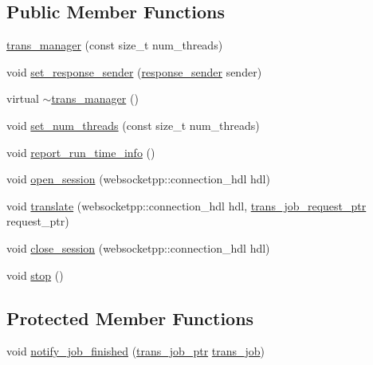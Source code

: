 \subsection*{Public Member Functions}
\begin{DoxyCompactItemize}
\item 
\hyperlink{classuva_1_1smt_1_1bpbd_1_1server_1_1trans__manager_a053a8f5be8b004358e5e20b3a1810efb}{trans\+\_\+manager} (const size\+\_\+t num\+\_\+threads)
\item 
void \hyperlink{classuva_1_1smt_1_1bpbd_1_1server_1_1trans__manager_a03bbff4118af58730ae43c9088203e00}{set\+\_\+response\+\_\+sender} (\hyperlink{classuva_1_1smt_1_1bpbd_1_1server_1_1trans__manager_ac7a3a0d2d4e7d21b2ce55161bf84f53e}{response\+\_\+sender} sender)
\item 
virtual \hyperlink{classuva_1_1smt_1_1bpbd_1_1server_1_1trans__manager_aa63b92c7bc0fdc41b879d02f16563506}{$\sim$trans\+\_\+manager} ()
\item 
void \hyperlink{classuva_1_1smt_1_1bpbd_1_1server_1_1trans__manager_a27073dba1257cacb734cc1063f2ee647}{set\+\_\+num\+\_\+threads} (const size\+\_\+t num\+\_\+threads)
\item 
void \hyperlink{classuva_1_1smt_1_1bpbd_1_1server_1_1trans__manager_ab943355ee7859a85c9d0e0cc6fd57206}{report\+\_\+run\+\_\+time\+\_\+info} ()
\item 
void \hyperlink{classuva_1_1smt_1_1bpbd_1_1server_1_1trans__manager_ac1d444c0788fe1ebbd2e771bff2dd5b9}{open\+\_\+session} (websocketpp\+::connection\+\_\+hdl hdl)
\item 
void \hyperlink{classuva_1_1smt_1_1bpbd_1_1server_1_1trans__manager_adfc5b34f1b6e6211f3c87626ccc2cfa0}{translate} (websocketpp\+::connection\+\_\+hdl hdl, \hyperlink{namespaceuva_1_1smt_1_1bpbd_1_1common_1_1messaging_af373ab262c0cab837c6ebe5e2eb62ea2}{trans\+\_\+job\+\_\+request\+\_\+ptr} request\+\_\+ptr)
\item 
void \hyperlink{classuva_1_1smt_1_1bpbd_1_1server_1_1trans__manager_a52ec4ea1281d987909f26d9775d7a543}{close\+\_\+session} (websocketpp\+::connection\+\_\+hdl hdl)
\item 
void \hyperlink{classuva_1_1smt_1_1bpbd_1_1server_1_1trans__manager_a8c538e77c532642d4ecd2cd2655f5db7}{stop} ()
\end{DoxyCompactItemize}
\subsection*{Protected Member Functions}
\begin{DoxyCompactItemize}
\item 
void \hyperlink{classuva_1_1smt_1_1bpbd_1_1server_1_1trans__manager_a027b8ceba8cf5ac3f21c5963033d4653}{notify\+\_\+job\+\_\+finished} (\hyperlink{namespaceuva_1_1smt_1_1bpbd_1_1server_acb76132c82e66b5dbf7e3aa0e5af2580}{trans\+\_\+job\+\_\+ptr} \hyperlink{classuva_1_1smt_1_1bpbd_1_1server_1_1trans__job}{trans\+\_\+job})
\end{DoxyCompactItemize}


